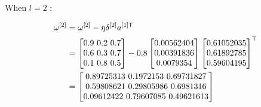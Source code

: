 \documentclass{article}
\begin{document}
\noindent When $l = 2$ :

\[
    \begin{aligned}
        \omega^{[2]} & =\omega^{[2]}-\eta\delta^{[2]}a^{[1]\mathsf{T}} \\
                     & =\begin{bmatrix}
                            0.9 $ 0.2 $ 0.7 \\
                            0.6 $ 0.3 $ 0.7 \\
                            0.1 $ 0.8 $ 0.5 \\
                        \end{bmatrix}
        - 0.8 \begin{bmatrix}
                  0.00562404 \\
                  0.00391836 \\
                  0.0079354  \\
              \end{bmatrix}
        \begin{bmatrix}
            0.61052035 \\
            0.61892785 \\
            0.59604195 \\
        \end{bmatrix}^{\mathsf{T}}                               \\
                     & = \begin{bmatrix}
                             0.89725313 $ 0.1972153  $ 0.69731827 \\
                             0.59808621 $ 0.29805986 $ 0.6981316  \\
                             0.09612422 $ 0.79607085 $ 0.49621613 \\
                         \end{bmatrix}
    \end{aligned}
\]
\end{document}
